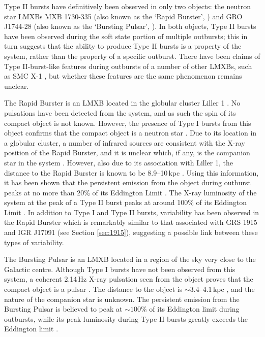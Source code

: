 \par Type II bursts have definitively been observed in only two objects: the neutron star LMXBs MXB 1730-335 (also known as the `Rapid Burster', \citealp{Lewin_TypeII}) and GRO J1744-28 (also known as the `Bursting Pulsar', \citealp{Paciesas_BPDiscovery}).  In both objects, Type II bursts have been observed during the soft state portion of multiple outbursts; this in turn suggests that the ability to produce Type II bursts is a property of the system, rather than the property of a specific outburst.  There have been claims of Type II-burst-like features during outbursts of a number of other LMXBs, such as SMC X-1 \citep{Angelini_SMC}, but whether these features are the same phenomenon remains unclear.
\par The Rapid Burster is an LMXB located in the globular cluster Liller 1 \citep{Lewin_TypeII}.  No pulsations have been detected from the system, and as such the spin of its compact object is not known.  However, the presence of Type I bursts from this object confirms that the compact object is a neutron star \citep{Hoffman_RB}.  Due to its location in a globular cluster, a number of infrared sources are consistent with the X-ray position of the Rapid Burster, and it is unclear which, if any, is the companion star in the system \citep{Homer_RBNoSec}.  However, also due to its association with Liller 1, the distance to the Rapid Burster is known to be 8.9--10\,kpc \citep{Ortolani_LillerD}.  Using this information, it has been shown that the persistent emission from the object during outburst peaks at no more than 20\% of its Eddington Limit \citep{Bagnoli_RB}.  The X-ray luminosity of the system at the peak of a Type II burst peaks at around 100\% of its Eddington Limit \citep{Tan_RBBursts,Bagnoli_PopStudy}.  In addition to Type I and Type II bursts, variability has been observed in the Rapid Burster which is remarkably similar to that associated with GRS 1915 and IGR J17091 (see Section \ref{sec:1915}), suggesting a possible link between these types of variability.
\par The Bursting Pulsar is an LMXB located in a region of the sky very close to the Galactic centre.  Although Type I bursts have not been observed from this system, a coherent 2.14\,Hz X-ray pulsation seen from the object proves that the compact object is a pulsar \citep{Kouveliotou_BPPulse}.  The distance to the object is $\sim3.4$--4.1\,kpc \citep{Sanna_BP}, and the nature of the companion star is unknown.  The persistent emission from the Bursting Pulsar is believed to peak at $\sim100$\% of its Eddington limit during outbursts, while its peak luminosity during Type II bursts greatly exceeds the Eddington limit \citep{Sturner_BPNature}.

